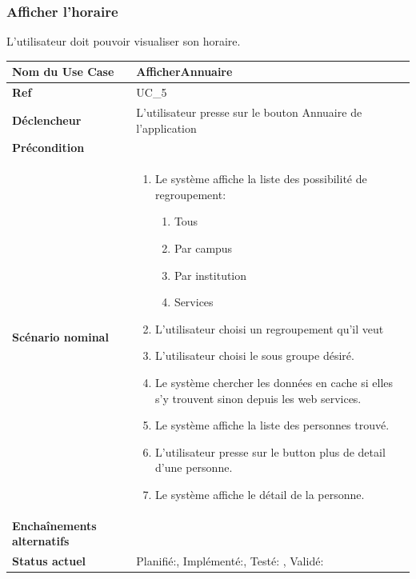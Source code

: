 

			\subsubsection{Afficher l'horaire}
								L'utilisateur doit pouvoir visualiser son horaire.\\[0.2cm]
								\begin{longtable}{|l|p{10cm}|}
									\hline \textbf{Nom du Use Case} & AfficherAnnuaire \\ 
									\hline \textbf{Ref} & UC\_5  \\ 
									\hline \textbf{Déclencheur} & L'utilisateur presse sur le bouton Annuaire  de l'application \\
									\hline \textbf{Précondition} &  \\
									\hline \textbf{Scénario nominal} & 
									\begin{enumerate}
										\item Le système affiche la liste des possibilité de regroupement:
											\begin{enumerate}
												\item Tous
												\item Par campus
												\item Par institution
												\item Services
											\end{enumerate}
										\item L'utilisateur choisi un regroupement qu'il veut
										\item L'utilisateur choisi le sous groupe désiré.
										\item Le système chercher les données en cache si elles s'y trouvent sinon depuis les web services.
										\item Le système affiche la liste des personnes trouvé.
										\item L'utilisateur presse sur le button plus de detail d'une personne.
										\item Le système affiche le détail de la personne.
									\end{enumerate}
									\\ 
									\hline \textbf{Enchaînements alternatifs} & \\
									\hline \textbf{Status actuel} & Planifié:\CheckedBox , Implémenté:\Square  , Testé: \Square  , Validé: \Square  \\
									\hline 
								\end{longtable} 
